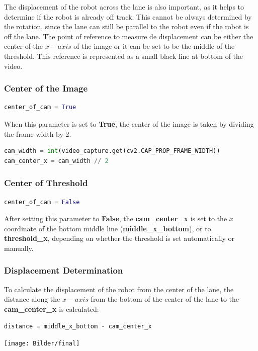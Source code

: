 \documentclass[12pt]{article}
\begin{document}
The displacement of the robot across the lane is also important, as it helps to determine if the robot is already off track. This cannot be always determined by the rotation, since the lane can still be parallel to the robot even if the robot is off the lane. The point of reference to measure de displacement can be either the center of the $x-axis$ of the image or it can be set to be the middle of the threshold. This reference is represented as a small black line at bottom of the video.
\subsubsection*{Center of the Image}
\begin{lstlisting}[language=Python]
center_of_cam = True
\end{lstlisting}

When this parameter is set to \textbf{True}, the center of the image is taken by dividing the frame width by 2. 
\begin{lstlisting}[language=Python]
cam_width = int(video_capture.get(cv2.CAP_PROP_FRAME_WIDTH))
cam_center_x = cam_width // 2
\end{lstlisting}
\subsubsection*{Center of Threshold}
\begin{lstlisting}[language=Python]
center_of_cam = False
\end{lstlisting}

After setting this parameter to \textbf{False}, the \textbf{cam\_center\_x} is set to the $x$ coordinate of the bottom middle line (\textbf{middle\_x\_bottom}), or to \textbf{threshold\_x}, depending on whether the threshold is set automatically or manually.
\subsubsection*{Displacement Determination}

To calculate the displacement of the robot from the center of the lane, the distance along the $x-axis$ from the bottom of the center of the lane to the \textbf{cam\_center\_x} is calculated:

\begin{lstlisting}[language=Python]
distance = middle_x_bottom - cam_center_x
\end{lstlisting}

\begin{center}
\texttt{[image: Bilder/final]}
\end{center}
\end{document}
